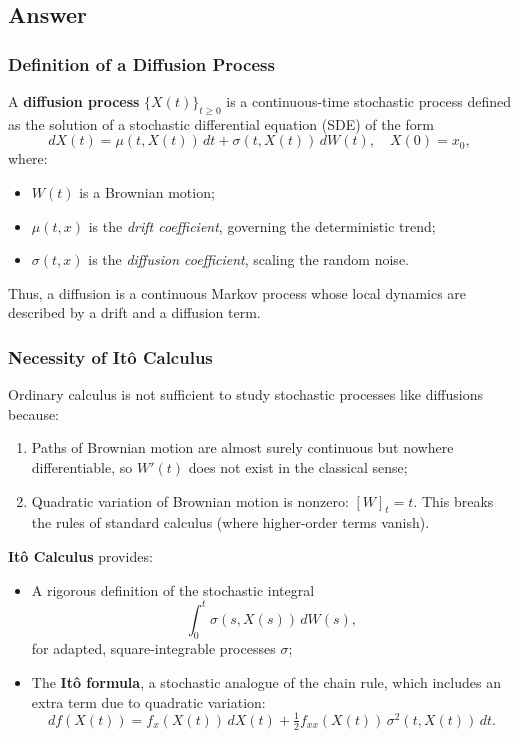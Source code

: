 \documentclass[12pt,a4paper]{book}
\theoremstyle{remark}
\begin{document}
\subsection*{Answer}

\subsubsection*{Definition of a Diffusion Process}
A \textbf{diffusion process} $\{X(t)\}_{t\ge 0}$ is a continuous-time stochastic process defined as the solution of a stochastic differential equation (SDE) of the form
\[
dX(t) = \mu(t,X(t))\,dt + \sigma(t,X(t))\,dW(t), \quad X(0)=x_0,
\]
where:
\begin{itemize}
    \item $W(t)$ is a Brownian motion;
    \item $\mu(t,x)$ is the \emph{drift coefficient}, governing the deterministic trend;
    \item $\sigma(t,x)$ is the \emph{diffusion coefficient}, scaling the random noise.
\end{itemize}
Thus, a diffusion is a continuous Markov process whose local dynamics are described by a drift and a diffusion term.

\subsubsection*{Necessity of Itô Calculus}
Ordinary calculus is not sufficient to study stochastic processes like diffusions because:
\begin{enumerate}[label=\roman*)]
    \item Paths of Brownian motion are almost surely continuous but nowhere differentiable, so $W'(t)$ does not exist in the classical sense;
    \item Quadratic variation of Brownian motion is nonzero: $[W]_t = t$. This breaks the rules of standard calculus (where higher-order terms vanish).
\end{enumerate}

\textbf{Itô Calculus} provides:
\begin{itemize}
    \item A rigorous definition of the stochastic integral
    \[
    \int_0^t \sigma(s,X(s))\,dW(s),
    \]
    for adapted, square-integrable processes $\sigma$;
    \item The \textbf{Itô formula}, a stochastic analogue of the chain rule, which includes an extra term due to quadratic variation:
    \[
    df(X(t)) = f_x(X(t))\,dX(t) + \tfrac{1}{2} f_{xx}(X(t))\,\sigma^2(t,X(t))\,dt.
    \]
\end{itemize}
\end{document}
